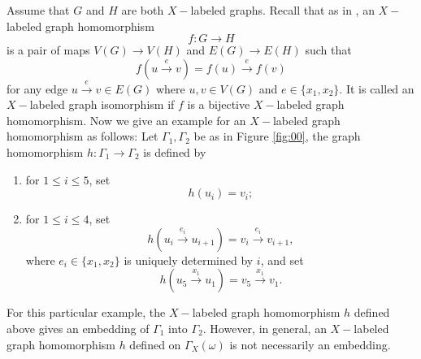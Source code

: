 \documentclass{amsart}
\theoremstyle{plain}
\theoremstyle{definition}
\theoremstyle{remark}
\begin{document}
\noindent Assume that $G$ and $H$ are both $X-$labeled graphs. Recall that as in \cite{PP15}, an $X-$labeled graph homomorphism $$f:G\to H$$ is a pair of maps $V(G)\to V(H)$ and $E(G)\to E(H)$ such that  
 $$f(u\overset{e}{\to}v)=f(u)\overset{e}{\to}f(v)$$
 for any edge $u\overset{e}{\to}v\in E(G)$ where $u,v\in V(G)$ and $e\in\{x_1,x_2\}$. It is called an $X-$labeled graph isomorphism if $f$ is a bijective $X-$labeled graph homomorphism. Now we give an example for an $X-$labeled graph homomorphism as follows: Let $\Gamma_1, \Gamma_2$ be as in Figure \ref{fig:00}, the graph homomorphism $h:\Gamma_1\to \Gamma_2$ is defined by
\begin{enumerate}
    \item for $1\leq i\leq 5$, set 
     $$h(u_i)=v_i;$$
    \item for $1\leq i\leq 4$, set
    $$h(u_i\overset{e_i}{\to}u_{i+1})=v_i\overset{e_i}{\to}v_{i+1},$$ where $e_i\in\{x_1,x_2\}$ is uniquely determined by $i$, and set
    $$h(u_5\overset{x_1}{\to}u_1)=v_5\overset{x_1}{\to}v_1.$$
\end{enumerate}
For this particular example, the $X-$labeled graph homomorphism $h$ defined above gives an embedding of $\Gamma_1$ into $\Gamma_2$. However, in general, an $X-$labeled graph homomorphism $h$ defined on $\Gamma_X(\omega)$ is not necessarily an embedding.
\end{document}
